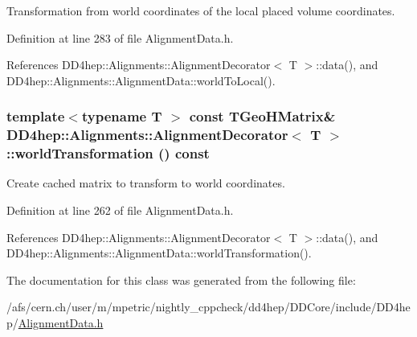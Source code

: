 Transformation from world coordinates of the local placed volume coordinates. 

Definition at line 283 of file AlignmentData.h.

References DD4hep::Alignments::AlignmentDecorator$<$ T $>$::data(), and DD4hep::Alignments::AlignmentData::worldToLocal().\hypertarget{class_d_d4hep_1_1_alignments_1_1_alignment_decorator_a24ba22a61084c9247777db4ab9edf270}{
\subsubsection[{worldTransformation}]{\setlength{\rightskip}{0pt plus 5cm}template$<$typename T $>$ const TGeoHMatrix\& {\bf DD4hep::Alignments::AlignmentDecorator}$<$ {\bf T} $>$::worldTransformation () const}}
\label{class_d_d4hep_1_1_alignments_1_1_alignment_decorator_a24ba22a61084c9247777db4ab9edf270}


Create cached matrix to transform to world coordinates. 

Definition at line 262 of file AlignmentData.h.

References DD4hep::Alignments::AlignmentDecorator$<$ T $>$::data(), and DD4hep::Alignments::AlignmentData::worldTransformation().

The documentation for this class was generated from the following file:\begin{DoxyCompactItemize}
\item 
/afs/cern.ch/user/m/mpetric/nightly\_\-cppcheck/dd4hep/DDCore/include/DD4hep/\hyperlink{_alignment_data_8h}{AlignmentData.h}\end{DoxyCompactItemize}
